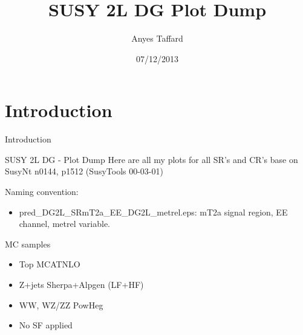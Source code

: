 \documentclass[10pt]{beamer}
\begin{document}
\author{Anyes Taffard}
\date{07/12/2013}

\title[SUSY 2L DG Plot Dump]{SUSY 2L DG Plot Dump}

\begin{frame}[plain]
  \titlepage
\end{frame}

\section{Introduction}
\begin{frame}{Introduction}
  \begin{block}{SUSY 2L DG - Plot Dump }
    Here are all my plots for all SR's and CR's base on SusyNt n0144, p1512 (SusyTools 00-03-01)

    Naming convention:
    \begin{itemize}
      \item pred\_DG2L\_SRmT2a\_EE\_DG2L\_metrel.eps: mT2a signal region, EE channel, metrel variable. 
    \end{itemize}

    MC samples
    \begin{itemize}
      \item Top MCATNLO
      \item Z+jets Sherpa+Alpgen (LF+HF)
      \item WW, WZ/ZZ PowHeg
	\item No SF applied 
    \end{itemize}

    

  \end{block}
\end{frame}


\end{document}
